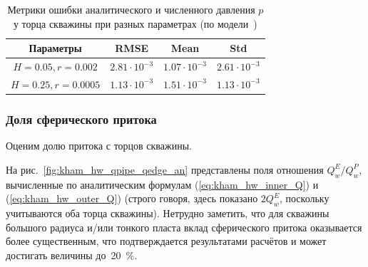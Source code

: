 \documentclass{article}
\begin{document}
\begin{table}[H]
	\centering
	\caption{
		Метрики ошибки аналитического и численного давления $p$ у торца скважины
		при разных параметрах (по модели~\cite{lit:kham_mazo_uzku_2015})
	}
	\label{tab:kham_hw_outer_p_error_metrics_mgrp}
	\begin{tabular}{|c|c|c|c|}  %
		\hline  %
		\textbf{Параметры} & \textbf{RMSE}        & \textbf{Mean}        & \textbf{Std}         \\
		\hline  %
		$H=0.05, r=0.002$  & $2.81 \cdot 10^{-3}$ & $1.07 \cdot 10^{-3}$ & $2.61 \cdot 10^{-3}$ \\
		\hline  %
		$H=0.25, r=0.0005$ & $1.13 \cdot 10^{-3}$ & $1.51 \cdot 10^{-3}$ & $1.13 \cdot 10^{-3}$ \\
		\hline  %
	\end{tabular}
\end{table}

\subsubsection{Доля сферического притока}

Оценим долю притока с торцов скважины.

На рис.~\ref{fig:kham_hw_qpipe_qedge_an} представлены поля отношения $Q_w^E / Q_w^P$,
вычисленные по аналитическим формулам (\ref{eq:kham_hw_inner_Q}) и (\ref{eq:kham_hw_outer_Q})
(строго говоря, здесь показано $2 Q_w^E$, поскольку учитываются оба торца скважины).
Нетрудно заметить, что для скважины большого радиуса и/или тонкого пласта
вклад сферического притока оказывается более существенным, что подтверждается результатами расчётов
и может достигать величины до~20~\%.
\end{document}
